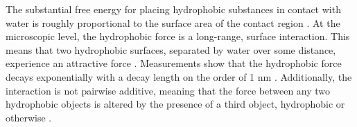 The substantial free energy for placing hydrophobic substances in contact with water 
is roughly proportional to the surface area of the contact region \cite{Bjorneholm2016}.  
At the microscopic level, the hydrophobic force is a long-range, surface
interaction. This means that two hydrophobic surfaces, separated by
water over some distance, experience an attractive force
\cite{Lum1999,Meyer2006,Hammer2010}. Measurements show that the
hydrophobic force decays exponentially with a decay length on the order of 1 nm
\cite{Israelachvili1984, Marcelja1977,Christenson2001,Lin2005}. 
Additionally, the interaction is not pairwise additive, meaning that
the force between any two hydrophobic objects is altered by the presence
of a third object, hydrophobic or otherwise \cite{SilveraBatista1242477}. 

